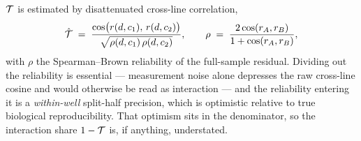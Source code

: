 $\mathcal{T}$ is estimated by disattenuated cross-line correlation,
\begin{equation}
  \hat{\mathcal{T}} \;=\; \frac{\cos\!\big(r(d,c_1),\, r(d,c_2)\big)}
                           {\sqrt{\rho(d,c_1)\,\rho(d,c_2)}},
  \qquad
  \rho \;=\; \frac{2\cos(r_A, r_B)}{1 + \cos(r_A, r_B)},
\end{equation}
with $\rho$ the Spearman--Brown reliability of the full-sample residual. Dividing out the
reliability is essential --- measurement noise alone depresses the raw cross-line cosine and would
otherwise be read as interaction --- and the reliability entering it is a \emph{within-well}
split-half precision, which is optimistic relative to true biological reproducibility. That
optimism sits in the denominator, so the interaction share $1 - \mathcal{T}$ is, if anything,
understated.

